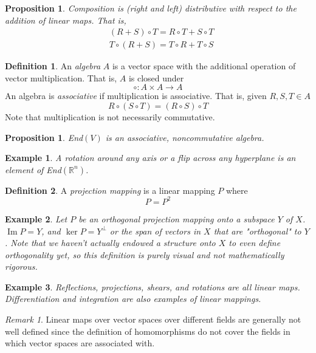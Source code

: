 \documentclass{article}
\DeclareMathOperator{\im}{Im}
\newtheorem{proposition}[theorem]{Proposition}
\newtheorem{example}{Example}[section]
\theoremstyle{remark}
\newtheorem*{remark}{Remark}
\theoremstyle{definition}
\newtheorem{definition}{Definition}[section]
\begin{document}
\begin{proposition}
Composition is (right and left) distributive with respect to the addition of linear maps. That is, 
\begin{align*}
    & (R + S) \circ T = R \circ T + S \circ T \\
    & T \circ (R + S) = T \circ R + T \circ S 
\end{align*}
\end{proposition}

\begin{definition}
An \textit{algebra} $A$ is a vector space with the additional operation of vector multiplication. That is, $A$ is closed under 
\[\circ: A \times A \longrightarrow A\] 
An algebra is \textit{associative} if multiplication is associative. That is, given $R, S, T \in A$
\[ R \circ (S \circ T) = (R \circ S) \circ T \]
Note that multiplication is not necessarily commutative. 
\end{definition}

\begin{proposition}
End$(V)$ is an associative, noncommutative algebra. 
\end{proposition}

\begin{example}
A rotation around any axis or a flip across any hyperplane is an element of End$(\mathbb{R}^n)$. 
\end{example}

\begin{definition}
A \textit{projection mapping} is a linear mapping $P$ where 
\[ P = P^2\]
\end{definition}

\begin{example}
Let $P$ be an orthogonal projection mapping onto a subspace $Y$ of $X$. $\im P = Y$, and $\ker P = Y^\perp$ or the span of vectors in $X$ that are "orthogonal" to $Y$. Note that we haven't actually endowed a structure onto $X$ to even define orthogonality yet, so this definition is purely visual and not mathematically rigorous. 
\end{example}

\begin{example}
Reflections, projections, shears, and rotations are all linear maps. Differentiation and integration are also examples of linear mappings. 
\end{example}

\begin{remark}
Linear maps over vector spaces over different fields are generally not well defined since the definition of homomorphisms do not cover the fields in which vector spaces are associated with. 
\end{remark}
\end{document}
